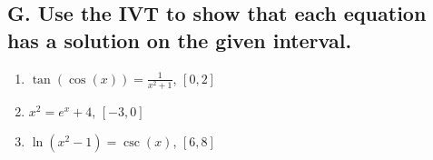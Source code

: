 \documentclass{article}
\begin{document}
\subsection*{G. Use the IVT to show that each equation has a solution on the given interval.}
\begin{multicols}{3}
\begin{enumerate}
    \item $\tan\left(\cos\left(x\right)\right)=\frac{1}{x^{2}+1}$, $[0, 2]$
    \item $x^{2}=e^{x}+4$, $[-3,0]$
    \item $\ln\left(x^{2}-1\right)=\csc\left(x\right)$, $[6,8]$
\end{enumerate}
\end{multicols}





\end{document}
